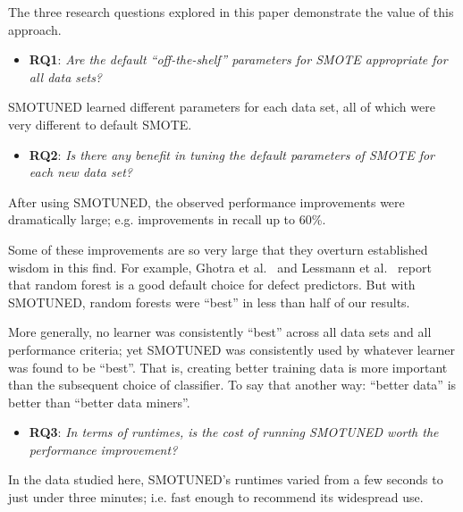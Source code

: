 \documentclass[10pt,conference]{IEEEtran}
\newcommand{\bi}{\begin{itemize}[leftmargin=0.4cm]}
\newcommand{\ei}{\end{itemize}}
\theoremstyle{break}
\theoremstyle{break}
\newcommand{\sma}{{\sc SMOTE}}
\newcommand{\smb}{{\sc SMOTUNED}}
\begin{document}
The three research questions explored in this paper demonstrate the value of this approach.
 \bi
 \item
  \textbf{RQ1}:  {\em Are the default ``off-the-shelf'' parameters for {\sma} appropriate for
  all data sets?} 
  \ei
 \begin{lesson}{\smb} learned different parameters for each data set, all of which  were very different to default SMOTE.
 \end{lesson}
  \bi
  \item
  \textbf{RQ2}: {\em   Is  there any benefit in tuning the default parameters of {\sma} for
  each new data set?} 
  \ei
   \begin{lesson}After using {\smb}, the observed performance improvements were dramatically large; e.g. improvements in recall  up to 60\%.
 \end{lesson}
Some of these improvements are so very large that they overturn established wisdom in this find.
For example,  Ghotra et al.~\cite{ghotra2015revisiting} and Lessmann et al.~\cite{lessmann2008benchmarking}
 report that   random forest is a  good default choice for  defect predictors.
But with  SMOTUNED, random forests were ``best'' in less
than half of  our results.

More generally, no learner was consistently ``best'' across all data sets and all performance criteria; yet {\smb} was consistently  used by  whatever  learner was found to be ``best''.  
That is,  creating better training data is more important
than the subsequent choice of classifier.  To say that another way: ``better data'' is better than ``better data miners''.
 
  
   \bi
  \item
  \textbf{RQ3}: {\em  In terms of runtimes, is the cost of running SMOTUNED worth the performance improvement?}
  \ei
  
   \begin{lesson}In the data studied here,
   SMOTUNED's  runtimes
   varied  from a few seconds to just under
   three minutes;  i.e.  fast enough
   to recommend its widespread use.
 \end{lesson}
\end{document}
